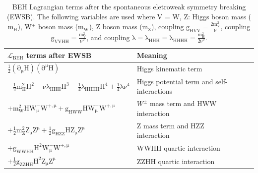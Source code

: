 \begin{table}[!htb]
\centering
\caption[BEH Lagrangian terms after the spontaneous eletroweak symmetry breaking (EWSB)]{BEH Lagrangian terms after the spontaneous eletroweak symmetry breaking (EWSB). The following variables are used  where V = W, Z: Higgs boson mass ($\mathrm{m_{H}}$), W$^{\pm}$ boson mass ($\mathrm{m_{W}}$), Z boson mass ($\mathrm{m_{Z}}$), coupling $\mathrm{g_{HVV}=\frac{2m_{V}^{2}}{\nu} }$, coupling $\mathrm{g_{VVHH}=\frac{m_{V}^{2}}{\nu^{2}}}$, and coupling $\mathrm{\lambda=\lambda_{HHH} = \lambda_{HHHH} = \frac{m_{H}^{2}} { 2 {\nu}^{2}}}$.}\label{Tab:higgs}
\begin{tabularx}{\textwidth}{XXXX}
\hline
$\mathrm{\mathcal{L}_{BEH}}$ terms after EWSB & Meaning \\
\hline
$\mathrm{\frac{1}{2}(\partial_{\mu}H)(\partial^{\mu}H)}$ & Higgs kinematic term \\[1pt]
$\mathrm{-\frac{1}{2}m_{H}^{2}H^{2} -\nu\lambda_{HHH} H^{3} -\frac{1}{4}\lambda_{HHHH} H^{4} + \frac{1}{4}\lambda \nu^{4}}  $ & Higgs potential term and self-interactions  \\[1pt]
$\mathrm{+ m_{W}^{2} H W_{\mu}^{-} W^{+,\mu} + g_{HWW} H W_{\mu}^{-} W^{+,\mu} }$ & $W^{\pm}$ mass term and HWW interaction \\[1pt]
$\mathrm{+\frac{1}{2}m_{Z}^{2}Z_{\mu}Z^{\mu} + \frac{1}{2} g_{HZZ}H Z_{\mu}Z^{\mu}}$  & Z mass term and HZZ interaction\\[1pt]
$\mathrm{+g_{WWHH} H^{2} W_{\mu}^{-} W^{+,\mu} }$ & WWHH quartic interaction\\[1pt]
$\mathrm{+\frac{1}{2} g_{ZZHH}H^{2} Z_{\mu}Z^{\mu} }$ & ZZHH quartic interaction\\[1pt]
\hline
\end{tabularx}
\end{table}


